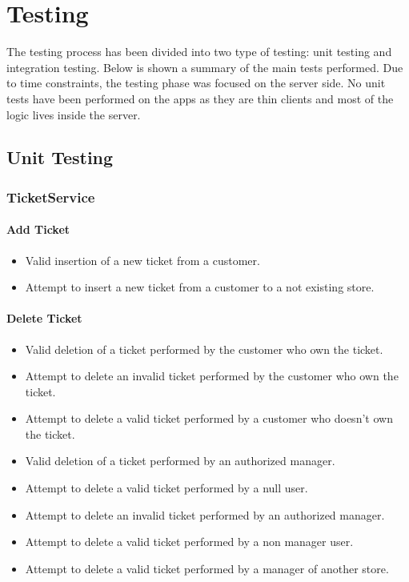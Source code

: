 \chapter{Testing}
The testing process has been divided into two type of testing: unit testing and integration testing. Below is shown a summary of the main tests performed.\newline
Due to time constraints, the testing phase was focused on the server side.\newline
No unit tests have been performed on the apps as they are thin clients and most of the logic lives inside the server. 

\section{Unit Testing}

\subsection{TicketService}
\subsubsection{Add Ticket}
\begin{itemize}
	\item Valid insertion of a new ticket from a customer.
	\item Attempt to insert a new ticket from a customer to a not existing store.
\end{itemize}

\subsubsection{Delete Ticket}
\begin{itemize}
	\item Valid deletion of a ticket performed by the customer who own the ticket.
	\item Attempt to delete an invalid ticket performed by the customer who own the ticket.
	\item Attempt to delete a valid ticket performed by a customer who doesn't own the ticket.
	\item Valid deletion of a ticket performed by an authorized manager.
	\item Attempt to delete a valid ticket performed by a null user.
	\item Attempt to delete an invalid ticket performed by an authorized manager.
	\item Attempt to delete a valid ticket performed by a non manager user.
	\item Attempt to delete a valid ticket performed by a manager of another store.
\end{itemize}

